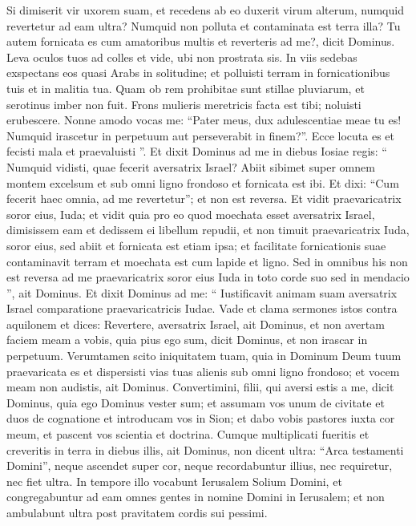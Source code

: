 \begin{biblechapter}
\begin{biblechapter}
\begin{biblechapter}
\verse Si dimiserit vir uxorem suam,
 et recedens ab eo
 duxerit virum alterum,
 numquid revertetur ad eam ultra?
 Numquid non polluta
 et contaminata est terra illa?
 Tu autem fornicata es cum amatoribus multis
 et reverteris ad me?,
 dicit Dominus.
 \verse Leva oculos tuos ad colles et vide,
 ubi non prostrata sis.
 In viis sedebas exspectans eos
 quasi Arabs in solitudine;
 et polluisti terram
 in fornicationibus tuis et in malitia tua.
 \verse Quam ob rem prohibitae sunt stillae pluviarum,
 et serotinus imber non fuit.
 Frons mulieris meretricis facta est tibi;
 noluisti erubescere.
 \verse Nonne amodo vocas me: “Pater meus,
 dux adulescentiae meae tu es!
 \verse Numquid irascetur in perpetuum
 aut perseverabit in finem?”.
 Ecce locuta es
 et fecisti mala et praevaluisti ”.
 \verse Et dixit Dominus ad me in diebus Iosiae regis: “ Numquid vidisti, quae fecerit aversatrix Israel? Abiit sibimet super omnem montem excelsum et sub omni ligno frondoso et fornicata est ibi. 
\verse Et dixi: “Cum fecerit haec omnia, ad me revertetur”; et non est reversa. Et vidit praevaricatrix soror eius, Iuda; 
\verse et vidit quia pro eo quod moechata esset aversatrix Israel, dimisissem eam et dedissem ei libellum repudii, et non timuit praevaricatrix Iuda, soror eius, sed abiit et fornicata est etiam ipsa; 
\verse et facilitate fornicationis suae contaminavit terram et moechata est cum lapide et ligno. 
\verse Sed in omnibus his non est reversa ad me praevaricatrix soror eius Iuda in toto corde suo sed in mendacio ”, ait Dominus.
 \verse Et dixit Dominus ad me: “ Iustificavit animam suam aversatrix Israel comparatione praevaricatricis Iudae. 
\verse Vade et clama sermones istos contra aquilonem et dices:
 Revertere, aversatrix Israel,
 ait Dominus,
 et non avertam faciem meam a vobis,
 quia pius ego sum,
 dicit Dominus,
 et non irascar in perpetuum.
 \verse Verumtamen scito iniquitatem tuam,
 quia in Dominum Deum tuum praevaricata es
 et dispersisti vias tuas alienis
 sub omni ligno frondoso;
 et vocem meam non audistis,
 ait Dominus.
 \verse Convertimini, filii, qui aversi estis a me, dicit Dominus, quia ego Dominus vester sum; et assumam vos unum de civitate et duos de cognatione et introducam vos in Sion; 
\verse et dabo vobis pastores iuxta cor meum, et pascent vos scientia et doctrina. 
\verse Cumque multiplicati fueritis et creveritis in terra in diebus illis, ait Dominus, non dicent ultra: “Arca testamenti Domini”, neque ascendet super cor, neque recordabuntur illius, nec requiretur, nec fiet ultra. 
\verse In tempore illo vocabunt Ierusalem Solium Domini, et congregabuntur ad eam omnes gentes in nomine Domini in Ierusalem; et non ambulabunt ultra post pravitatem cordis sui pessimi. 

\end{biblechapter}
\end{biblechapter}
\end{biblechapter}
